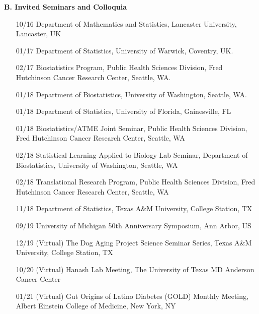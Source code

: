 \documentclass[10pt]{article}
\begin{document}
\textbf{B. Invited Seminars and Colloquia}
\begin{enumerate}\setcounter{enumi}{14}
\item[10/16] Department of Mathematics and Statistics, Lancaster University, Lancaster, UK
\item[01/17] Department of Statistics, University of Warwick, Coventry, UK. 
\item[02/17] Biostatistics Program, Public Health Sciences Division, Fred Hutchinson Cancer Research Center, Seattle, WA.
\item[01/18] Department of Biostatistics, University of Washington, Seattle, WA.
\item[01/18] Department of Statistics, University of Florida, Gainesville, FL
\item[01/18] Biostatistics/ATME Joint Seminar, Public Health Sciences Division, Fred Hutchinson Cancer Research Center, Seattle, WA
\item[02/18] Statistical Learning Applied to Biology Lab Seminar, Department of Biostatistics, University of Washington, Seattle, WA
\item[02/18] Translational Research Program, Public Health Sciences Division, Fred Hutchinson Cancer Research Center, Seattle, WA
\item[11/18] Department of Statistics, Texas A\&M University, College Station, TX
\item[09/19] University of Michigan 50th Anniversary Symposium, Ann Arbor, US
\item[12/19] (Virtual) The Dog Aging Project Science Seminar Series, Texas A\&M University, College Station, TX
\item[10/20] (Virtual) Hanash Lab Meeting, The University of Texas MD Anderson Cancer Center
\item[01/21] (Virtual) Gut Origins of Latino Diabetes (GOLD) Monthly Meeting, Albert Einstein College of Medicine, New York, NY

\end{enumerate}
\end{document}
